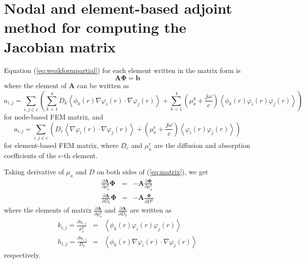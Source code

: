 \documentclass[12pt]{book}               %
\begin{document}
\section{Nodal and element-based adjoint method for computing the Jacobian matrix}
Equation (\ref{eq:weakformpartial}) for each element written in the
matrix form is
\begin{equation}
\label{eq:matrix} \mathbf{A}{\boldsymbol\Phi}=\mathbf{b}
\end{equation}
where the element of $\mathbf{A}$ can be written as
\begin{equation}
a_{i,j}=\sum_{i,j\in e}\left(\sum_{k=1}^4D_k\left\langle
\phi_k(r)\nabla\varphi_i(r)\cdot\nabla\varphi_j(r)\right\rangle+\sum_{k=1}^4\left(\mu_{a}^k+\frac{j\omega}{c}\right)\left\langle\phi_k(r)\varphi_i(r)\varphi_j(r)\right\rangle\right)
\end{equation}
for node-based FEM matrix, and 
\begin{equation}
a_{i,j}=\sum_{i,j\in e}\left(D_e\left\langle
\nabla\varphi_i(r)\cdot\nabla\varphi_j(r)\right\rangle+\left(\mu_{a}^{e}+\frac{j\omega}{c}\right)\left\langle\varphi_i(r)\varphi_j(r)\right\rangle\right)
\end{equation}
for element-based FEM matrix, where $D_e$ and $\mu_a^{e}$ are the diffusion and absorption coefficients 
of the $e$-th element.

Taking derivative of $\mu_a$ and $D$ on both sides of
(\ref{eq:matrix}), we get
\begin{eqnarray}
\frac{\partial \mathbf{A}}{\partial
\mu_a^k}{\boldsymbol\Phi}&=&-\mathbf{A}\frac{\partial {\boldsymbol\Phi}}{\partial \mu_a^k}\\
\frac{\partial \mathbf{A}}{\partial
D_k}{\boldsymbol\Phi}&=&-\mathbf{A}\frac{\boldsymbol\Phi}{\partial
D^k}
\end{eqnarray}
where the elements of matrix $\frac{\partial \mathbf{A}}{\partial
\mu_a^k}$ and $\frac{\partial \mathbf{A}}{\partial D_k}$ are
written as
\begin{eqnarray}
k_{i,j}=\frac{\partial
a_{i,j}}{\mu_a^k}&=&\left\langle\phi_k(r)\varphi_i(r)\varphi_j(r)\right\rangle\\
h_{i,j}=\frac{\partial a_{i,j}}{D_k}&=&\left\langle
\phi_k(r)\nabla\varphi_i(r)\cdot\nabla\varphi_j(r)\right\rangle
\end{eqnarray}
respectively.
\end{document}
